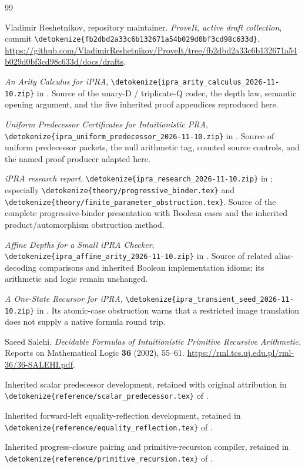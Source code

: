 \documentclass[11pt,letterpaper]{article}
\theoremstyle{definition}\newtheorem{definition}[theorem]{Definition}
\theoremstyle{remark}\newtheorem{remark}[theorem]{Remark}
\newcommand{\file}[1]{\expandafter\nolinkurl\expandafter{\detokenize{#1}}}
\begin{document}
\clearpage
\begin{thebibliography}{99}
\raggedright
{}
Vladimir Reshetnikov, repository maintainer.
\emph{ProveIt, active draft collection}, commit
\file{fb2dbd2a33c6b132671a54b029d0bf3cd98c633d}.
\url{https://github.com/VladimirReshetnikov/ProveIt/tree/fb2dbd2a33c6b132671a54b029d0bf3cd98c633d/docs/drafts}.

\emph{An Arity Calculus for iPRA},
\file{ipra_arity_calculus_2026-11-10.zip} in \cite{corpus}.
Source of the unary-D / triplicate-Q codec, the depth law, semantic
opening argument, and the five inherited proof appendices reproduced here.

\emph{Uniform Predecessor Certificates for Intuitionistic PRA},
\file{ipra_uniform_predecessor_2026-11-10.zip} in \cite{corpus}.
Source of uniform predecessor packets, the null arithmetic tag, counted
source controls, and the named proof producer adapted here.

\emph{iPRA research report},
\file{ipra_research_2026-11-10.zip} in \cite{corpus}; especially
\file{theory/progressive_binder.tex} and
\file{theory/finite_parameter_obstruction.tex}.
Source of the complete progressive-binder presentation with Boolean
cases and the inherited product/automorphism obstruction method.

\emph{Affine Depths for a Small iPRA Checker},
\file{ipra_affine_arity_2026-11-10.zip} in \cite{corpus}.
Source of related alias-decoding comparisons and inherited Boolean
implementation idioms; its arithmetic and logic remain unchanged.

\emph{A One-State Recursor for iPRA},
\file{ipra_transient_seed_2026-11-10.zip} in \cite{corpus}.
Its atomic-case obstruction warns that a restricted image translation
does not supply a native formula round trip.

Saeed Salehi. \emph{Decidable Formulas of Intuitionistic Primitive
Recursive Arithmetic}. Reports on Mathematical Logic \textbf{36}
(2002), 55--61.
\url{https://rml.tcs.uj.edu.pl/rml-36/36-SALEHI.pdf}.

Inherited scalar predecessor development, retained with original
attribution in \file{reference/scalar_predecessor.tex} of \cite{arity}.

Inherited forward-left equality-reflection development, retained in
\file{reference/equality_reflection.tex} of \cite{arity}.

Inherited progress-closure pairing and primitive-recursion compiler,
retained in \file{reference/primitive_recursion.tex} of \cite{arity}.
\end{thebibliography}
\end{document}
